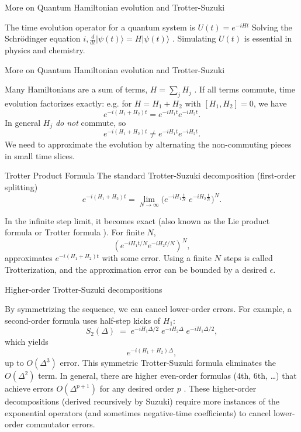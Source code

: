 \documentclass{beamer}
\begin{document}
\begin{frame}{More on Quantum Hamiltonian evolution and Trotter-Suzuki}

\begin{block}{The time evolution operator for a quantum system is $U(t)=e^{-iHt}$}
Solving the Schrödinger equation $i,\frac{d}{dt}|\psi(t)\rangle =
H|\psi(t)\rangle$ . Simulating $U(t)$ is essential in physics and
chemistry.
\end{block}

\end{frame}


\begin{frame}{More on Quantum Hamiltonian evolution and Trotter-Suzuki}


\begin{block}{}
Many Hamiltonians are a sum of terms, $H=\sum_j H_j$ . If all terms
commute, time evolution factorizes exactly: e.g. for $H=H_1+H_2$ with
$[H_1,H_2]=0$, we have
\[
e^{-i(H_1+H_2)t}=e^{-iH_1 t}e^{-iH_2 t}.
\]
In general $H_j$ \textit{do not} commute, so
\[
e^{-i(H_1+H_2)t}\neq e^{-iH_1t}e^{-iH_2t}.
\]
We need to approximate the evolution by alternating the non-commuting pieces in small time slices. 
\end{block}
\end{frame}


\begin{frame}{Trotter Product Formula}
The standard Trotter-Suzuki decomposition (first-order splitting)
\[
e^{-i(H_1+H_2)t} = \lim_{N\to\infty}\Big(e^{-iH_1 \frac{t}{N}}\;e^{-iH_2 \frac{t}{N}}\Big)^N.
\]

In the infinite step limit, it becomes exact (also known as the Lie
product formula or Trotter formula ).  For finite $N$,
\[
(e^{-iH_1t/N}e^{-iH_2 t/N})^N,
\]
approximates $e^{-i(H_1+H_2)t}$ with some
error. Using a finite $N$ steps is called Trotterization, and the
approximation error can be bounded by a desired $\epsilon$. 

\end{frame}


\begin{frame}{Higher-order Trotter-Suzuki decompositions}

By symmetrizing the sequence, we can cancel lower-order errors. For example, a second-order formula uses half-step kicks of $H_1$: 
\[
S_{2}(\Delta) \;=\; e^{-iH_1 \Delta/2}\;e^{-iH_2 \Delta}\;e^{-iH_1 \Delta/2},
\]
which yields 
\[
e^{-i(H_1+H_2)\Delta},
\]
up to $O(\Delta^3)$ error. This symmetric Trotter-Suzuki formula eliminates the $O(\Delta^2)$ term.
In general, there are higher even-order formulas ($4$th, $6$th, …) that achieve errors $O(\Delta^{p+1})$ for any desired order $p$ . These higher-order decompositions (derived recursively by Suzuki) require more instances of the exponential operators (and sometimes negative-time coefficients) to cancel lower-order commutator errors. 

\end{frame}
\end{document}
